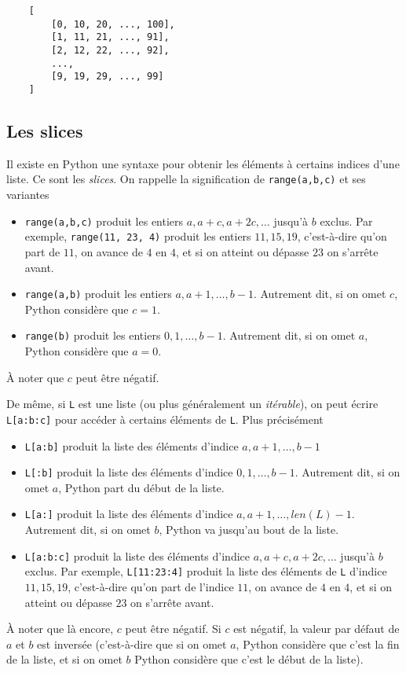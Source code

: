\begin{verbatim}
    [
        [0, 10, 20, ..., 100],
        [1, 11, 21, ..., 91],
        [2, 12, 22, ..., 92],
        ...,
        [9, 19, 29, ..., 99]
    ]
\end{verbatim}

\subsection{Les slices}

Il existe en Python une syntaxe pour obtenir les éléments à certains indices d'une liste. Ce sont les \textit{slices}. On rappelle la signification de \texttt{range(a,b,c)} et ses variantes
\begin{itemize}
    \item \texttt{range(a,b,c)} produit les entiers $ a, a+c, a+2c, \ldots $ jusqu'à $ b $ exclus. Par exemple, \texttt{range(11, 23, 4)} produit les entiers $ 11, 15, 19 $, c'est-à-dire qu'on part de $ 11 $, on avance de $ 4 $ en $ 4 $, et si on atteint ou dépasse $ 23 $ on s'arrête avant.
    \item \texttt{range(a,b)} produit les entiers $ a, a+1, \ldots, b-1 $. Autrement dit, si on omet $ c $, Python considère que $ c=1 $.
    \item \texttt{range(b)} produit les entiers $ 0, 1, \ldots, b-1 $. Autrement dit, si on omet $ a $, Python considère que $ a=0 $.
\end{itemize}
À noter que $ c $ peut être négatif.

De même, si \texttt{L} est une liste (ou plus généralement un \textit{itérable}), on peut écrire \texttt{L[a:b:c]} pour accéder à certains éléments de \texttt{L}. Plus précisément
\begin{itemize}
    \item \texttt{L[a:b]} produit la liste des éléments d'indice $ a, a+1, \ldots, b-1 $
    \item \texttt{L[:b]} produit la liste des éléments d'indice $ 0, 1, \ldots, b-1 $. Autrement dit, si on omet $ a $, Python part du début de la liste.
    \item \texttt{L[a:]} produit la liste des éléments d'indice $ a, a+1, \ldots, len(L)-1 $. Autrement dit, si on omet $ b $, Python va jusqu'au bout de la liste.
    \item \texttt{L[a:b:c]} produit la liste des éléments d'indice $ a, a+c, a+2c, \ldots $ jusqu'à $ b $ exclus. Par exemple, \texttt{L[11:23:4]} produit la liste des éléments de \texttt{L} d'indice $ 11, 15, 19 $, c'est-à-dire qu'on part de l'indice $ 11 $, on avance de $ 4 $ en $ 4 $, et si on atteint ou dépasse $ 23 $ on s'arrête avant.
\end{itemize}
À noter que là encore, $ c $ peut être négatif. Si $ c $ est négatif, la valeur par défaut de $ a $ et $ b $ est inversée (c'est-à-dire que si on omet $ a $, Python considère que c'est la fin de la liste, et si on omet $ b $ Python considère que c'est le début de la liste).

